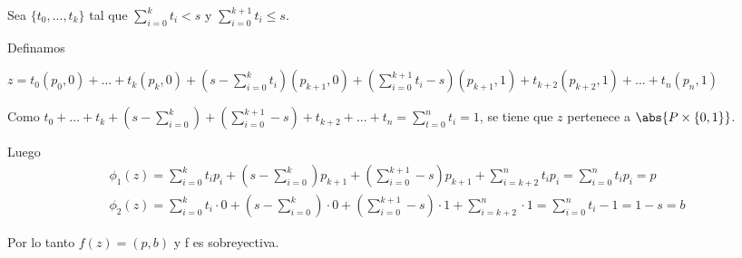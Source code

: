\begin{Dem}
Sea $\{t_0,...,t_k\} $ tal que $\sum_{i=0}^{k}t_i <s$ y $\sum_{i=0}^{k+1}t_i\leq s$.

Definamos

$z =t_0(p_0,0)+ ...+ t_k(p_k,0)+(s-\sum_{i=0}^{k}t_i)(p_{k+1},0)+(\sum_{i=0}^{k+1}t_i-s)(p_{k+1},1)+t_{k+2}(p_{k+2},1)+...+t_n(p_n,1)$ 

Como $t_0 +...+t_k+(s-\sum_{i=0}^{k})+(\sum_{i=0}^{k+1}-s)+t_{k+2}+...+t_n = \sum_{t=0}^{n}t_i = 1$, se tiene que $z$ pertenece a $\abs{P\times\{0,1\}}$.

Luego
\begin{eqnarray*}
\phi_1(z) = \sum_{i=0}^{k}t_ip_i + (s-\sum_{i=0}^{k})p_{k+1} +(\sum_{i=0}^{k+1}-s)p_{k+1} + \sum_{i = k+2}^{n}t_ip_i = \sum_{i=0}^{n}t_ip_i = p\\
\phi_2(z) = \sum_{i=0}^{k}t_i\cdot 0 + (s-\sum_{i=0}^{k})\cdot 0 +(\sum_{i=0}^{k+1}-s)\cdot 1 + \sum_{i = k+2}^{n}\cdot 1 = \sum_{i=0}^{n}t_i -1 = 1-s = b
\end{eqnarray*}

Por lo tanto $f(z)=(p,b)$ y f es sobreyectiva.
\end{Dem}


